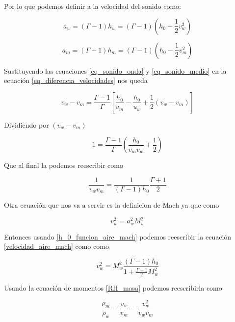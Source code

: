 \documentclass[12pt,a4paper]{book}
\begin{document}
Por lo que podemos definir a la velocidad del sonido como:

\begin{equation} \label{eq_sonido_onda}
  a_w = \left( \Gamma-1 \right) h_w = \left( \Gamma-1 \right) \left( h_0 -\frac{1}{2} v_w^2 \right)
\end{equation}

\begin{equation} \label{eq_sonido_medio}
  a_m = \left( \Gamma-1 \right) h_m = \left( \Gamma-1 \right) \left( h_0 -\frac{1}{2} v_m^2 \right)
\end{equation}

Sustituyendo las ecuaciones \ref{eq_sonido_onda} y \ref{eq_sonido_medio} en la ecuación \ref{eq_diferencia_velocidades}
nos queda

\begin{equation}
  v_w-v_m = \frac{\Gamma - 1}{\Gamma} \left[ \frac{h_0}{v_m} - \frac{h_0}{u_w} + \frac{1}{2} \left( v_w - v_m\right) \right]
\end{equation}

Dividiendo por $ \left( v_w - v_m \right)$

\begin{equation}
  1 = \frac{\Gamma - 1}{\Gamma} \left( \frac{h_0}{v_m v_w} + \frac{1}{2} \right)
\end{equation}

Que al final la podemos reescribir como

\begin{equation} \label{eq_denominador}
  \frac{1}{v_w v_m} = \frac{1}{\left( \Gamma -1\right) h_0} \frac{\Gamma + 1}{2}
\end{equation}

Otra ecuación que nos va a servir es la definicion de Mach ya que como

\begin{equation}\label{velocidad_aire_mach}
  v_w^2 = a_w^2 M_w^2
\end{equation}

Entonces usando \ref{h_0_funcion_aire_mach} podemos reescribir la ecuación \ref{velocidad_aire_mach} como
como

\begin{equation} \label{eq_numerador}
  v_w^2 = M_w^2 \frac{\left( \Gamma -1 \right) h_0}{1+\frac{\Gamma - 1}{2} M_w^2}
\end{equation}

Usando la ecuación de momentos \ref{RH_masa} podemos reescribirla como

\begin{equation} \label{eq_fraccion_momentos}
  \frac{\rho_m }{\rho_w} = \frac{ v_w}{v_m} = \frac{v_w^2}{v_w v_m}
\end{equation}
\end{document}
